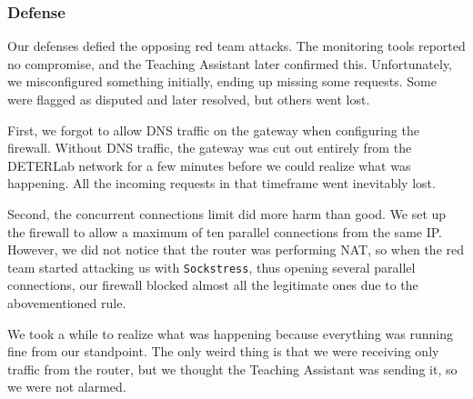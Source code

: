 \subsubsection{Defense}
\label{sec:cctf-secure:exec:def}

Our defenses defied the opposing red team attacks. The monitoring tools reported no compromise, and the Teaching Assistant later confirmed this. Unfortunately, we misconfigured something initially, ending up missing some requests. Some were flagged as disputed and later resolved, but others went lost.

First, we forgot to allow DNS traffic on the gateway when configuring the firewall. Without DNS traffic, the gateway was cut out entirely from the DETERLab network for a few minutes before we could realize what was happening. All the incoming requests in that timeframe went inevitably lost.

Second, the concurrent connections limit did more harm than good. We set up the firewall to allow a maximum of ten parallel connections from the same IP. However, we did not notice that the router was performing NAT, so when the red team started attacking us with \texttt{Sockstress}, thus opening several parallel connections, our firewall blocked almost all the legitimate ones due to the abovementioned rule.

We took a while to realize what was happening because everything was running fine from our standpoint. The only weird thing is that we were receiving only traffic from the router, but we thought the Teaching Assistant was sending it, so we were not alarmed.
\clearpage
\newpage